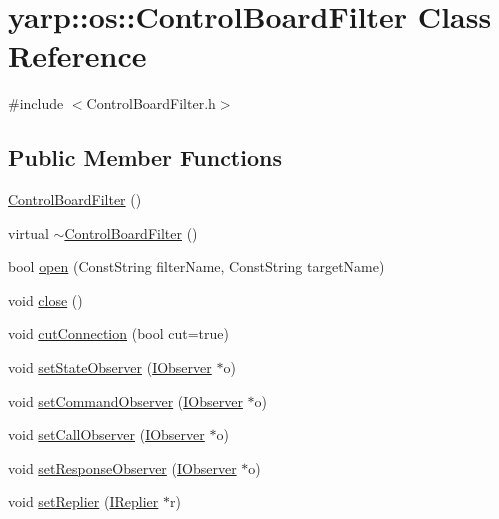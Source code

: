 \hypertarget{classyarp_1_1os_1_1_control_board_filter}{
\section{yarp::os::ControlBoardFilter Class Reference}
\label{classyarp_1_1os_1_1_control_board_filter}
}


{\ttfamily \#include $<$ControlBoardFilter.h$>$}\subsection*{Public Member Functions}
\begin{DoxyCompactItemize}
\item 
\hyperlink{classyarp_1_1os_1_1_control_board_filter_a4cd0bdff78668dd46a8a567b3ce60144}{ControlBoardFilter} ()
\item 
virtual \hyperlink{classyarp_1_1os_1_1_control_board_filter_a5c3f6dd113745a570fd06d616cc4e16a}{$\sim$ControlBoardFilter} ()
\item 
bool \hyperlink{classyarp_1_1os_1_1_control_board_filter_a27f3aa5419bce6ad6e421ddcb2e52131}{open} (ConstString filterName, ConstString targetName)
\item 
void \hyperlink{classyarp_1_1os_1_1_control_board_filter_a6224733f849144002f5b0f89f30ffb17}{close} ()
\item 
void \hyperlink{classyarp_1_1os_1_1_control_board_filter_a97baafa3310ec3ecad9c348c29c8b09c}{cutConnection} (bool cut=true)
\item 
void \hyperlink{classyarp_1_1os_1_1_control_board_filter_af23fad9bab89b2a57c4fb32eb99d76ef}{setStateObserver} (\hyperlink{classyarp_1_1os_1_1_i_observer}{IObserver} $\ast$o)
\item 
void \hyperlink{classyarp_1_1os_1_1_control_board_filter_a2500ae8300c6ca835f5b25133e1d04ed}{setCommandObserver} (\hyperlink{classyarp_1_1os_1_1_i_observer}{IObserver} $\ast$o)
\item 
void \hyperlink{classyarp_1_1os_1_1_control_board_filter_a72b5abaf68eb361c79d9de5071eb36b9}{setCallObserver} (\hyperlink{classyarp_1_1os_1_1_i_observer}{IObserver} $\ast$o)
\item 
void \hyperlink{classyarp_1_1os_1_1_control_board_filter_acf3896d97b179e36d41d275087c33c4e}{setResponseObserver} (\hyperlink{classyarp_1_1os_1_1_i_observer}{IObserver} $\ast$o)
\item 
void \hyperlink{classyarp_1_1os_1_1_control_board_filter_a6d3b3916553af9221093518d93c49c99}{setReplier} (\hyperlink{classyarp_1_1os_1_1_i_replier}{IReplier} $\ast$r)

\end{DoxyCompactItemize}
